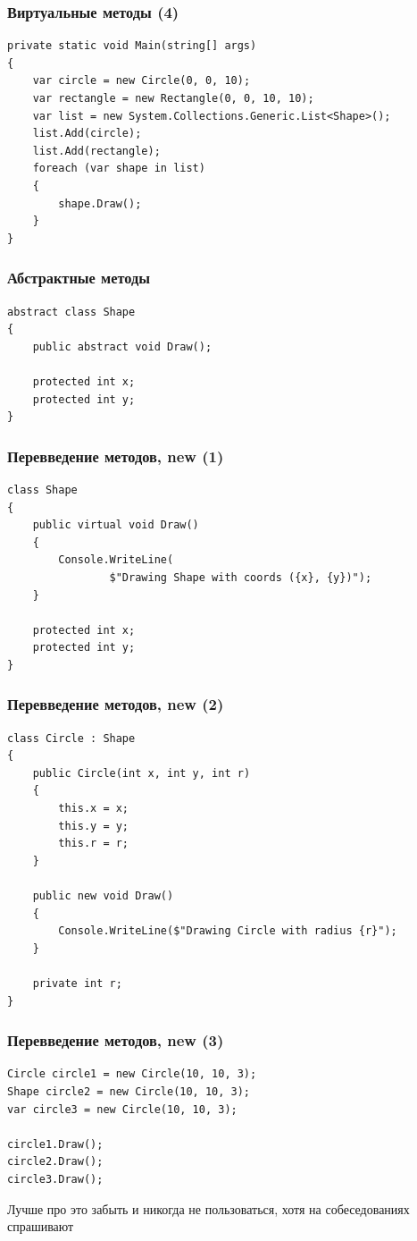 \documentclass[xetex,mathserif,serif]{beamer}
\begin{document}
    \begin{frame}[fragile]
        \frametitle{Виртуальные методы (4)}
        \begin{verbatim}
private static void Main(string[] args)
{
    var circle = new Circle(0, 0, 10);
    var rectangle = new Rectangle(0, 0, 10, 10);
    var list = new System.Collections.Generic.List<Shape>();
    list.Add(circle);
    list.Add(rectangle);
    foreach (var shape in list)
    {
        shape.Draw();
    }
}
        \end{verbatim}
    \end{frame}

    \begin{frame}[fragile]
        \frametitle{Абстрактные методы}
        \begin{verbatim}
abstract class Shape
{
    public abstract void Draw();

    protected int x;
    protected int y;
}
        \end{verbatim}
\end{frame}

    \begin{frame}[fragile]
        \frametitle{Перевведение методов, new (1)}
        \begin{verbatim}
class Shape
{
    public virtual void Draw()
    {
        Console.WriteLine(
                $"Drawing Shape with coords ({x}, {y})");
    }

    protected int x;
    protected int y;
}
        \end{verbatim}
    \end{frame}

    \begin{frame}[fragile]
        \frametitle{Перевведение методов, new (2)}
        \begin{small}
            \begin{verbatim}
class Circle : Shape
{
    public Circle(int x, int y, int r)
    {
        this.x = x;
        this.y = y;
        this.r = r;
    }

    public new void Draw()
    {
        Console.WriteLine($"Drawing Circle with radius {r}");
    }

    private int r;
}
            \end{verbatim}
        \end{small}
    \end{frame}

    \begin{frame}[fragile]
        \frametitle{Перевведение методов, new (3)}
        \begin{verbatim}
Circle circle1 = new Circle(10, 10, 3);
Shape circle2 = new Circle(10, 10, 3);
var circle3 = new Circle(10, 10, 3);

circle1.Draw();
circle2.Draw();
circle3.Draw();
        \end{verbatim}
        \vspace{1cm}
        Лучше про это забыть и никогда не пользоваться, хотя на собеседованиях спрашивают
    \end{frame}
\end{document}

